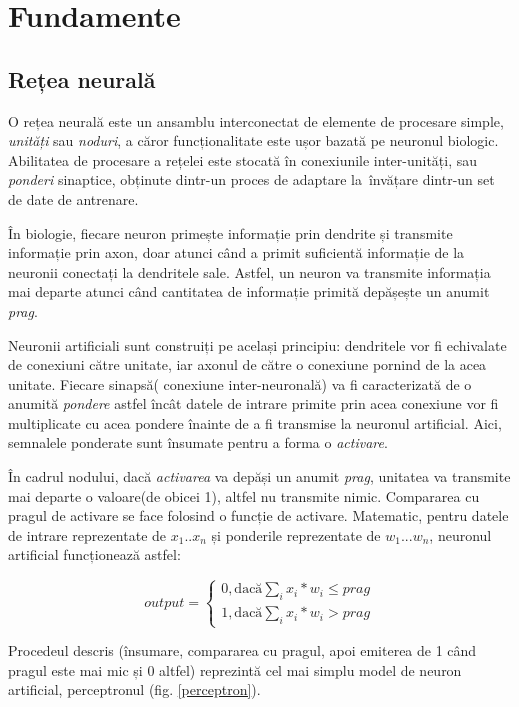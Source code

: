 \chapter{Fundamente}


\section{Rețea neurală}
O rețea neurală este un ansamblu interconectat de elemente de procesare simple, \textit{unități} sau \textit{noduri}, a căror funcționalitate este ușor bazată pe neuronul biologic. Abilitatea de procesare a rețelei este stocată în conexiunile inter-unități, sau \textit{ponderi} sinaptice, obținute dintr-un proces de adaptare la\ învățare dintr-un set de date de antrenare.\cite{Gurney:1997:INN:523781}

În biologie, fiecare neuron primește informație prin dendrite și transmite  informație prin axon, doar atunci când a primit suficientă informație de la neuronii conectați la dendritele sale. Astfel, un neuron va transmite informația mai departe atunci când cantitatea de informație primită depășește un anumit \textit{prag}.

Neuronii artificiali sunt construiți pe același principiu: dendritele vor fi echivalate de conexiuni către unitate, iar axonul de către o conexiune pornind de la acea unitate. Fiecare sinapsă( conexiune inter-neuronală) va fi caracterizată de o anumită \textit{pondere} astfel încât datele de intrare primite prin acea conexiune vor fi multiplicate cu acea pondere înainte de a fi transmise la neuronul artificial. Aici, semnalele ponderate sunt însumate pentru a forma o \textit{activare}.

În cadrul nodului, dacă \textit{activarea} va depăși un anumit \textit{prag}, unitatea va transmite mai departe o valoare(de obicei 1), altfel nu transmite nimic. Compararea cu pragul de activare se face folosind o funcție de activare. Matematic, pentru datele de intrare reprezentate de $x_1 .. x_n$ și ponderile reprezentate de $w_1 ... w_n$, neuronul artificial funcționează astfel: 

\[
output =
\begin{cases} 
  0, \text{dacă} \sum_{i} x_i*w_i \leq prag \\
  1, \text{dacă}  \sum_{i} x_i*w_i > prag 
\end{cases}
\]     

Procedeul descris (însumare, compararea cu pragul, apoi emiterea de 1 când pragul este mai mic și 0 altfel) reprezintă cel mai simplu model de neuron artificial, perceptronul (fig. \ref{perceptron}). 

